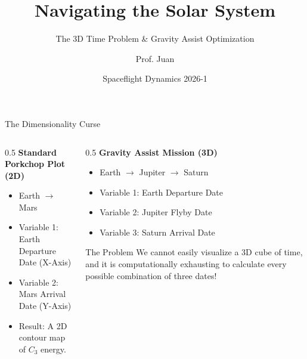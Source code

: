 \documentclass[aspectratio=169]{beamer}
\title[Astrodynamics: Multi-Planet Optimization]{Navigating the Solar System}
\subtitle{The 3D Time Problem \& Gravity Assist Optimization}
\author{Prof. Juan}
\institute{Aerospace Engineering Program \\ Universidad de Antioquia}
\date{Spaceflight Dynamics 2026-1}
\begin{document}
\begin{frame}
    \titlepage
\end{frame}

\begin{frame}{The Dimensionality Curse}
    \begin{columns}
        \begin{column}{0.5\textwidth}
            \textbf{Standard Porkchop Plot (2D)}
            \begin{itemize}
                \item Earth $\rightarrow$ Mars
                \item Variable 1: Earth Departure Date (X-Axis)
                \item Variable 2: Mars Arrival Date (Y-Axis)
                \item Result: A 2D contour map of $C_3$ energy.
            \end{itemize}
        \end{column}
        \begin{column}{0.5\textwidth}
            \textbf{Gravity Assist Mission (3D)}
            \begin{itemize}
                \item Earth $\rightarrow$ Jupiter $\rightarrow$ Saturn
                \item Variable 1: Earth Departure Date
                \item Variable 2: Jupiter Flyby Date
                \item Variable 3: Saturn Arrival Date
            \end{itemize}
            \vspace{0.3cm}
            \begin{alertblock}{The Problem}
                We cannot easily visualize a 3D cube of time, and it is computationally exhausting to calculate every possible combination of three dates!
            \end{alertblock}
        \end{column}
    \end{columns}
\end{frame}
\end{document}
